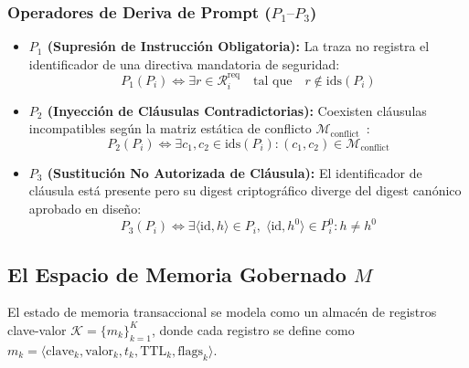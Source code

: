 \documentclass[conference]{IEEEtran}
\begin{document}
\subsubsection{Operadores de Deriva de Prompt ($P_1\text{--}P_3$)}
\begin{itemize}
    \item \textbf{$P_1$ (Supresi\'on de Instrucci\'on Obligatoria):} La traza no registra el identificador de una directiva mandatoria de seguridad:
    \begin{equation}
    P_1(P_i) \iff \exists r \in \mathcal{R}_i^{\text{req}} \quad \text{tal que} \quad r \notin \text{ids}(P_i)
    \end{equation}
    \item \textbf{$P_2$ (Inyecci\'on de Cl\'ausulas Contradictorias):} Coexisten cl\'ausulas incompatibles seg\'un la matriz est\'atica de conflicto $\mathcal{M}_{\text{conflict}}$~\cite{tafreshipour2025}:
    \begin{equation}
    P_2(P_i) \iff \exists c_1, c_2 \in \text{ids}(P_i) : (c_1, c_2) \in \mathcal{M}_{\text{conflict}}
    \end{equation}
    \item \textbf{$P_3$ (Sustituci\'on No Autorizada de Cl\'ausula):} El identificador de cl\'ausula est\'a presente pero su digest criptogr\'afico diverge del digest can\'onico aprobado en dise\~no:
    \begin{equation}
    P_3(P_i) \iff \exists \langle \text{id}, h \rangle \in P_i, \; \langle \text{id}, h^0 \rangle \in P_i^0 : h \neq h^0
    \end{equation}
\end{itemize}

\subsection{El Espacio de Memoria Gobernado $M$}
El estado de memoria transaccional se modela como un almac\'en de registros clave-valor $\mathcal{K} = \{m_k\}_{k=1}^K$, donde cada registro se define como $m_k = \langle \text{clave}_k, \text{valor}_k, t_k, \text{TTL}_k, \text{flags}_k \rangle$.
\end{document}
